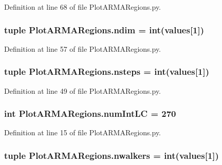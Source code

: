 Definition at line 68 of file Plot\-A\-R\-M\-A\-Regions.\-py.

\hypertarget{namespace_plot_a_r_m_a_regions_a6d9523e891d3f88e36e2c83da27f05a9}{
\subsubsection[{ndim}]{\setlength{\rightskip}{0pt plus 5cm}tuple Plot\-A\-R\-M\-A\-Regions.\-ndim = int({\bf values}\mbox{[}1\mbox{]})}}\label{namespace_plot_a_r_m_a_regions_a6d9523e891d3f88e36e2c83da27f05a9}


Definition at line 57 of file Plot\-A\-R\-M\-A\-Regions.\-py.

\hypertarget{namespace_plot_a_r_m_a_regions_a400da7acac41459d918d50e10fcd9735}{
\subsubsection[{nsteps}]{\setlength{\rightskip}{0pt plus 5cm}tuple Plot\-A\-R\-M\-A\-Regions.\-nsteps = int({\bf values}\mbox{[}1\mbox{]})}}\label{namespace_plot_a_r_m_a_regions_a400da7acac41459d918d50e10fcd9735}


Definition at line 49 of file Plot\-A\-R\-M\-A\-Regions.\-py.

\hypertarget{namespace_plot_a_r_m_a_regions_a9a622e1006cc8cc55b062f42b9e4c980}{
\subsubsection[{num\-Int\-L\-C}]{\setlength{\rightskip}{0pt plus 5cm}int Plot\-A\-R\-M\-A\-Regions.\-num\-Int\-L\-C = 270}}\label{namespace_plot_a_r_m_a_regions_a9a622e1006cc8cc55b062f42b9e4c980}


Definition at line 15 of file Plot\-A\-R\-M\-A\-Regions.\-py.

\hypertarget{namespace_plot_a_r_m_a_regions_ad8d2b4da6dbf7506bdf2e3ae4a66e626}{
\subsubsection[{nwalkers}]{\setlength{\rightskip}{0pt plus 5cm}tuple Plot\-A\-R\-M\-A\-Regions.\-nwalkers = int({\bf values}\mbox{[}1\mbox{]})}}\label{namespace_plot_a_r_m_a_regions_ad8d2b4da6dbf7506bdf2e3ae4a66e626}



